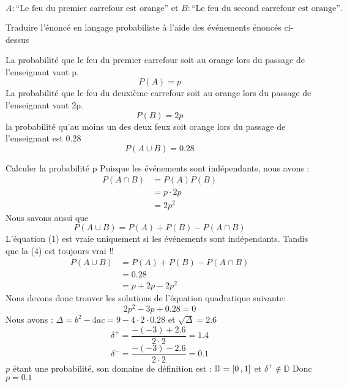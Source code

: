\begin{exo}
  $$A : \text{“Le feu du premier carrefour est orange” et } B : \text{“Le feu du second carrefour est orange”.}$$
  \begin{subexo}{Traduire l'énoncé en langage probabiliste à l'aide des événements énoncés ci-dessus}

    La probabilité que le feu du premier carrefour soit au orange lors du passage de l'enseignant vaut p.
    $$P(A) = p$$
    La probabilité que le feu du deuxième carrefour soit au orange lors du passage de l'enseignant vaut 2p.
    $$P(B) = 2p$$
    la
    probabilité qu’au moins un des deux feux soit orange lors du passage de l’enseignant est 0.28
    $$P(A\cup B) = 0.28$$

  \end{subexo}
  \begin{subexo}{Calculer la probabilité p}
    Puisque les événements sont indépendants, nous avons :
        \begin{align}
          P(A \cap B) &= P(A) P(B)\\
      &= p \cdot 2p\\
      &= 2p^2
        \end{align}
      Nous savons aussi que
        \begin{equation}
          P(A \cup B) = P(A) + P(B) -P(A \cap B)
        \end{equation}
        L'équation (1) est vraie uniquement si les événements sont indépendants. Tandis que la (4) est toujours vrai !!
        \begin{align}
          P(A \cup B) &= P(A) + P(B) -P(A \cap B)\\
           &= 0.28\\
           &= p + 2p - 2p^2
        \end{align}
        Nous devons donc trouver les solutions de l'équation quadratique suivante:
        $$2p^2 - 3p + 0.28 = 0$$
          Nous avons : $\Delta = b^2 -4ac = 9 -4\cdot 2\cdot 0.28$\newline
           et $\sqrt{\Delta} = 2.6$
           $$\delta^+ = \frac{-(-3) + 2.6}{2\cdot2} = 1.4$$
           $$\delta^- = \frac{-(-3) - 2.6}{2\cdot2} = 0.1$$
          $p$ étant une probabilité, son domaine de définition est : $\mathbb{D} = \mathopen{[}0\mathpunct{},1\mathclose{]}$ et $\delta^+ \notin \mathbb{D}$
          Donc $p = 0.1$
  \end{subexo}
\end{exo}
